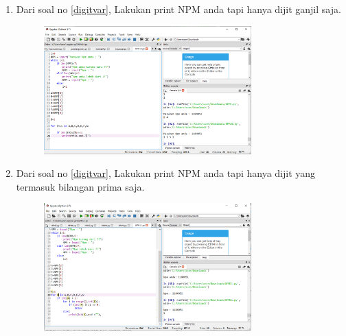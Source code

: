 \begin{enumerate}
\item
Dari soal no \ref{digitvar}, Lakukan print NPM anda tapi hanya dijit ganjil saja.
\begin{figure}[h]
\centerline{\includegraphics[width=8cm]{figures/npm10.PNG}}
\end{figure}


\item 
Dari soal no \ref{digitvar}, Lakukan print NPM anda tapi hanya dijit yang termasuk bilangan prima saja.
\begin{figure}[h]
\centerline{\includegraphics[width=8cm]{figures/npmsebelas.PNG}}
\end{figure}


\end{enumerate}


